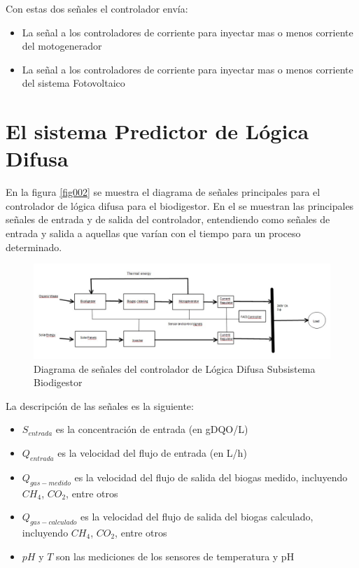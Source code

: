 \documentclass[12pt,letterpaper,twoside]{book}
\begin{document}
Con estas dos señales el controlador envía:

\begin{itemize}
\item La señal a los controladores de corriente para inyectar mas o menos corriente del motogenerador
\item La señal a los controladores de corriente para inyectar mas o menos corriente del sistema Fotovoltaico
\end{itemize}

\section{El sistema Predictor de Lógica Difusa}

En la figura \ref{fig002} se muestra el diagrama de señales principales para el controlador de lógica difusa para el biodigestor. En el se muestran las principales señales de entrada y de salida del controlador, entendiendo como señales de entrada y salida a aquellas que varían con el tiempo para un proceso determinado. 

\begin{figure}
\centering
\includegraphics[width=6.5in]{GeneraldeEnergia.jpg}
\caption{Diagrama de señales del controlador de Lógica Difusa Subsistema Biodigestor}
\label{fig001}
\end{figure}

La descripción de las señales es la siguiente:
\begin{itemize}
\item $S_{entrada}$ es la concentración de entrada (en gDQO/L)
\item $Q_{entrada}$ es la velocidad del flujo de entrada (en L/h)
\item $Q_{gas-medido}$ es la velocidad del flujo de salida del biogas medido, incluyendo $CH_4$, $CO_2$, entre otros
\item $Q_{gas-calculado}$ es la velocidad del flujo de salida del biogas calculado, incluyendo $CH_4$, $CO_2$, entre otros
\item $pH$ y $T$ son las mediciones de los sensores de temperatura y pH
\end{itemize}
\end{document}
